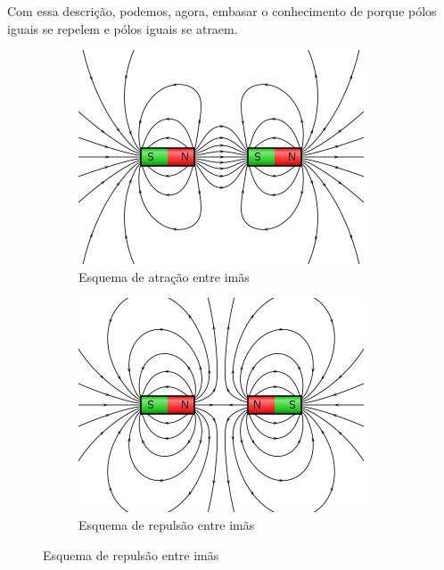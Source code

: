 \documentclass[12pt]{extarticle}
\newcommand{\<}{\langle}
\renewcommand{\>}{\rangle}
\theoremstyle{definition}
\begin{document}
Com essa descrição, podemos, agora, embasar o conhecimento de porque pólos iguais se repelem e pólos iguais se atraem.
\begin{figure}[H]
     \centering
     \begin{subfigure}[b]{0.45\textwidth}
         \centering
         \includegraphics[width=\textwidth]{VFPt_cylindrical_magnets_attracting.svg.png}
         \caption{Esquema de atração entre imãs}
         \label{fig:attraction_mag_field}
     \end{subfigure}
     \hfill
     \begin{subfigure}[b]{0.45\textwidth}
         \centering
         \includegraphics[width=\textwidth]{320px-VFPt_cylindrical_magnets_repelling.svg.png}
         \caption{Esquema de repulsão entre imãs}
         \label{fig:repulsion_mag_field}
     \end{subfigure}
\end{figure}
\end{document}
